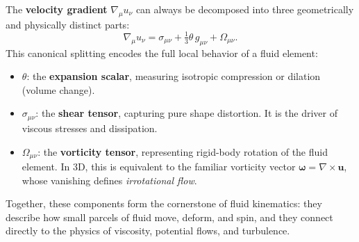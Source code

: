 \begin{bigidea}
The \textbf{velocity gradient} $\nabla_\mu u_\nu$ can always be decomposed into three geometrically and physically distinct parts:
\[
\nabla_\mu u_\nu = \sigma_{\mu\nu} + \tfrac{1}{3}\theta\, g_{\mu\nu} + \Omega_{\mu\nu}.
\]
This canonical splitting encodes the full local behavior of a fluid element:
\begin{itemize}
  \item $\theta$: the \textbf{expansion scalar}, measuring isotropic compression or dilation (volume change).
  \item $\sigma_{\mu\nu}$: the \textbf{shear tensor}, capturing pure shape distortion. It is the driver of viscous stresses and dissipation.
  \item $\Omega_{\mu\nu}$: the \textbf{vorticity tensor}, representing rigid-body rotation of the fluid element. In 3D, this is equivalent to the familiar vorticity vector $\boldsymbol{\omega} = \nabla \times \mathbf{u}$, whose vanishing defines \emph{irrotational flow}.
\end{itemize}
Together, these components form the cornerstone of fluid kinematics: they describe how small parcels of fluid move, deform, and spin, and they connect directly to the physics of viscosity, potential flows, and turbulence.
\end{bigidea}
